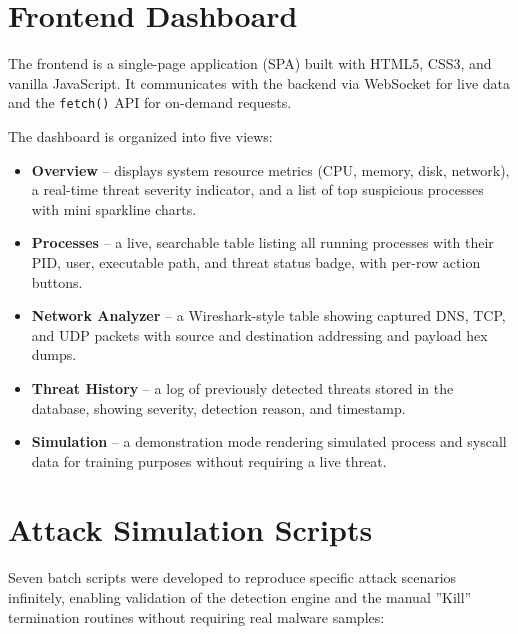 \section{Frontend Dashboard}

The frontend is a single-page application (SPA) built with HTML5, CSS3, and vanilla JavaScript. It communicates with the backend via WebSocket for live data and the \texttt{fetch()} API for on-demand requests.

The dashboard is organized into five views:

\begin{itemize}
    \item \textbf{Overview} -- displays system resource metrics (CPU, memory, disk, network), a real-time threat severity indicator, and a list of top suspicious processes with mini sparkline charts.
    \item \textbf{Processes} -- a live, searchable table listing all running processes with their PID, user, executable path, and threat status badge, with per-row action buttons.
    \item \textbf{Network Analyzer} -- a Wireshark-style table showing captured DNS, TCP, and UDP packets with source and destination addressing and payload hex dumps.
    \item \textbf{Threat History} -- a log of previously detected threats stored in the database, showing severity, detection reason, and timestamp.
    \item \textbf{Simulation} -- a demonstration mode rendering simulated process and syscall data for training purposes without requiring a live threat.
\end{itemize}

\section{Attack Simulation Scripts}

Seven batch scripts were developed to reproduce specific attack scenarios infinitely, enabling validation of the detection engine and the manual ''Kill'' termination routines without requiring real malware samples:

